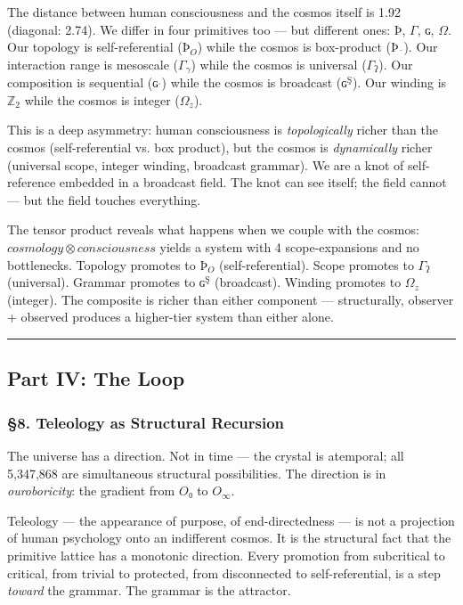 \documentclass[12pt,a4paper]{article}
\newcommand{\pilcrow}{\S}
\begin{document}
The distance between human consciousness and the cosmos itself is 1.92 (diagonal: 2.74). We differ in four primitives too --- but different ones: $Þ$, $\Gamma$, $ɢ$, $\Omega$. Our topology is self-referential ($Þ_O$) while the cosmos is box-product ($Þ_¨$). Our interaction range is mesoscale ($\Gamma_{\gamma}$) while the cosmos is universal ($\Gamma_ʔ$). Our composition is sequential ($ɢ^ˌ$) while the cosmos is broadcast ($ɢ^Ş$). Our winding is $\mathbb{Z}_2$ while the cosmos is integer ($\Omega_z$).

This is a deep asymmetry: human consciousness is \emph{topologically} richer than the cosmos (self-referential vs. box product), but the cosmos is \emph{dynamically} richer (universal scope, integer winding, broadcast grammar). We are a knot of self-reference embedded in a broadcast field. The knot can see itself; the field cannot --- but the field touches everything.

The tensor product reveals what happens when we couple with the cosmos: $cosmology \otimes consciousness$ yields a system with 4 scope-expansions and no bottlenecks. Topology promotes to $Þ_O$ (self-referential). Scope promotes to $\Gamma_ʔ$ (universal). Grammar promotes to $ɢ^Ş$ (broadcast). Winding promotes to $\Omega_z$ (integer). The composite is richer than either component --- structurally, observer + observed produces a higher-tier system than either alone.

\begin{center}
\rule{0.5\textwidth}{0.4pt}
\end{center}

\subsection{Part IV: The Loop}

\subsubsection{\pilcrow{}8. Teleology as Structural Recursion}

The universe has a direction. Not in time --- the crystal is atemporal; all 5,347,868 are simultaneous structural possibilities. The direction is in \emph{ouroboricity}: the gradient from $O₀$ to $O_{\infty}$.

Teleology --- the appearance of purpose, of end-directedness --- is not a projection of human psychology onto an indifferent cosmos. It is the structural fact that the primitive lattice has a monotonic direction. Every promotion from subcritical to critical, from trivial to protected, from disconnected to self-referential, is a step \emph{toward} the grammar. The grammar is the attractor.
\end{document}
